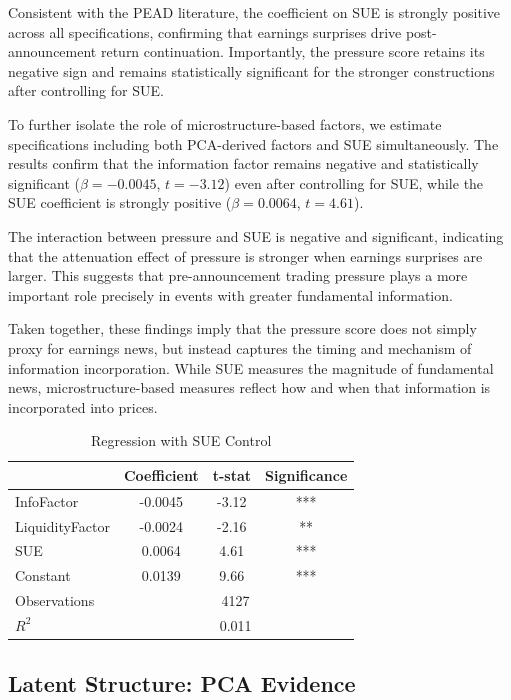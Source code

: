 Consistent with the PEAD literature, the coefficient on SUE is strongly positive across all specifications, confirming that earnings surprises drive post-announcement return continuation. Importantly, the pressure score retains its negative sign and remains statistically significant for the stronger constructions after controlling for SUE.

To further isolate the role of microstructure-based factors, we estimate specifications including both PCA-derived factors and SUE simultaneously. The results confirm that the information factor remains negative and statistically significant ($\beta = -0.0045$, $t = -3.12$) even after controlling for SUE, while the SUE coefficient is strongly positive ($\beta = 0.0064$, $t = 4.61$).

The interaction between pressure and SUE is negative and significant, indicating that the attenuation effect of pressure is stronger when earnings surprises are larger. This suggests that pre-announcement trading pressure plays a more important role precisely in events with greater fundamental information.

Taken together, these findings imply that the pressure score does not simply proxy for earnings news, but instead captures the timing and mechanism of information incorporation. While SUE measures the magnitude of fundamental news, microstructure-based measures reflect how and when that information is incorporated into prices.
\begin{table}[!t]
\centering
\caption{Regression with SUE Control}
\label{tab:sue_control}
\begin{tabular}{lccc}
\hline
 & Coefficient & t-stat & Significance \\
\hline
InfoFactor & -0.0045 & -3.12 & *** \\
LiquidityFactor & -0.0024 & -2.16 & ** \\
SUE & 0.0064 & 4.61 & *** \\
Constant & 0.0139 & 9.66 & *** \\
\hline
Observations & \multicolumn{3}{c}{4127} \\
$R^2$ & \multicolumn{3}{c}{0.011} \\
\hline
\end{tabular}
\end{table}

\subsection{Latent Structure: PCA Evidence}

